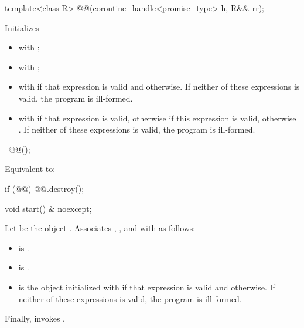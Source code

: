 %
\begin{itemdecl}
template<class R>
  @@(coroutine_handle<promise_type> h, R&& rr);
\end{itemdecl}
\begin{itemdescr}
\pnum
\effects
Initializes
\begin{itemize}
\item {} with ;
\item {} with ;
\item {}
with  if that expression
is valid and  otherwise.
If neither of these expressions is valid, the program is ill-formed.
\item {} with
 if that expression is
valid, otherwise 
if this expression is valid, otherwise .
If neither of these expressions is valid, the program is ill-formed.
\end{itemize}
\end{itemdescr}

%
\begin{itemdecl}
~@@();
\end{itemdecl}
\begin{itemdescr}
\pnum
\effects
Equivalent to:
\begin{codeblock}
if (@@)
  @@.destroy();
\end{codeblock}
\end{itemdescr}

%
\begin{itemdecl}
void start() & noexcept;
\end{itemdecl}
\begin{itemdescr}
\pnum
\effects
Let  be the object .
Associates , , and 
with  as follows:
\begin{itemize}
\item {} is .
\item {} is .
\item {} is the object initialized
with 
if that expression is valid and  otherwise.
If neither of these expressions is valid, the program is ill-formed.
\end{itemize}
Finally, invokes .
\end{itemdescr}

